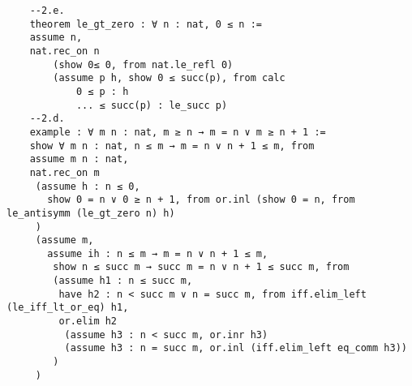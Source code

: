 \begin{enumerate}
\begin{lstlisting}
    --2.e.
    theorem le_gt_zero : ∀ n : nat, 0 ≤ n :=
    assume n,
    nat.rec_on n
        (show 0≤ 0, from nat.le_refl 0)
        (assume p h, show 0 ≤ succ(p), from calc
            0 ≤ p : h
            ... ≤ succ(p) : le_succ p)
    --2.d.
    example : ∀ m n : nat, m ≥ n → m = n ∨ m ≥ n + 1 :=
    show ∀ m n : nat, n ≤ m → m = n ∨ n + 1 ≤ m, from
    assume m n : nat,
    nat.rec_on m
     (assume h : n ≤ 0,
       show 0 = n ∨ 0 ≥ n + 1, from or.inl (show 0 = n, from le_antisymm (le_gt_zero n) h)
     )
     (assume m,
       assume ih : n ≤ m → m = n ∨ n + 1 ≤ m,
        show n ≤ succ m → succ m = n ∨ n + 1 ≤ succ m, from
        (assume h1 : n ≤ succ m,
         have h2 : n < succ m ∨ n = succ m, from iff.elim_left (le_iff_lt_or_eq) h1, 
         or.elim h2
          (assume h3 : n < succ m, or.inr h3)
          (assume h3 : n = succ m, or.inl (iff.elim_left eq_comm h3))
        )
     )
    \end{lstlisting}
\end{enumerate}